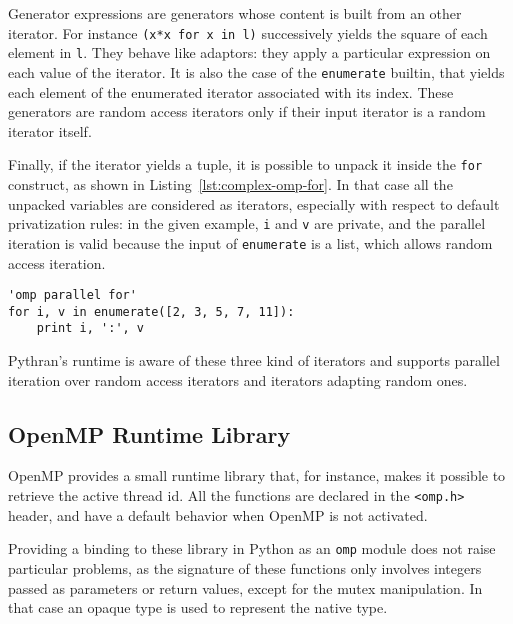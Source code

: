\documentclass[conference]{IEEEtran}
\begin{document}
Generator expressions are generators whose content is built from an other
iterator. For instance \texttt{(x*x for x in l)} successively yields the square
of each element in \texttt{l}. They behave like adaptors: they apply a
particular expression on each value of the iterator. It is also the case of the
\texttt{enumerate} builtin, that yields each element of the enumerated iterator
associated with its index. These generators are random access iterators only if their
input iterator is a random iterator itself.

Finally, if the iterator yields a tuple, it is possible to unpack it inside the
\texttt{for} construct, as shown in Listing~\ref{lst:complex-omp-for}. In that case
all the unpacked variables are considered as iterators, especially with respect
to default privatization rules: in the given example, \texttt{i} and \texttt{v}
are private, and the parallel iteration is valid because the input of
\texttt{enumerate} is a list, which allows random access iteration.

\begin{lstlisting}[float, label={lst:complex-omp-for}, caption={Parallel
    loop in Pythran with tuple unpacking.}]
'omp parallel for'
for i, v in enumerate([2, 3, 5, 7, 11]):
    print i, ':', v
\end{lstlisting}

Pythran's runtime is aware of these three kind of iterators and supports
parallel iteration over random access iterators and iterators adapting random
ones.

\subsection{OpenMP Runtime Library}

OpenMP provides a small runtime library that, for instance, makes it possible to
retrieve the active thread id. All the functions are declared in the
\texttt{<omp.h>} header, and have a default behavior when OpenMP is not
activated.

Providing a binding to these library in Python as an \texttt{omp} module does
not raise particular problems, as the signature of these functions only involves
integers passed as parameters or return values, except for the mutex
manipulation. In that case an opaque type is used to represent the native type.
\end{document}
